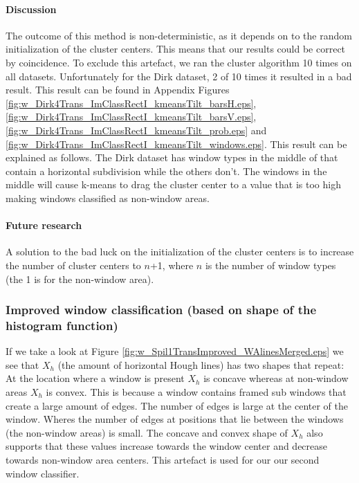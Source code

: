 

\paragraph{Discussion}  %
The outcome of this method is non-deterministic, as it depends on to the random
initialization of the cluster centers. This means that our results could be
correct by coincidence.  To exclude this artefact, we ran the cluster algorithm
10 times on all datasets. Unfortunately for the Dirk dataset, 2 of 10 times it 
resulted in a bad result. This result can be found in Appendix
Figures \ref{fig:w_Dirk4Trans_ImClassRectI_kmeansTilt_barsH.eps},
\ref{fig:w_Dirk4Trans_ImClassRectI_kmeansTilt_barsV.eps},
\ref{fig:w_Dirk4Trans_ImClassRectI_kmeansTilt_prob.eps} and
\ref{fig:w_Dirk4Trans_ImClassRectI_kmeansTilt_windows.eps}.
This result can be explained as follows. The Dirk dataset has window types in the
middle of that contain a horizontal subdivision while the others don't.
The windows in the middle will cause k-means to drag the cluster center to a
value that is too high making windows classified as non-window areas.

\paragraph{Future research}
A solution to the bad luck on the initialization of the cluster centers 
is to increase the number of cluster centers to $n$+1, 
where $n$ is the number of window types (the 1 is for the non-window area).




\subsubsection{Improved window classification (based on shape of the histogram function)}
If we take a look at Figure \ref{fig:w_Spil1TransImproved_WAlinesMerged.eps}
we see that $X_h$ (the amount of horizontal Hough lines) has two shapes that
repeat:  At the location where a window is present $X_h$ is concave whereas at
non-window areas $X_h$ is convex. 
This is because a window contains framed sub windows that create 
a large amount of edges. The number of edges is large at the center of the
window.  Wheres the number of edges at positions that lie between the windows
(the non-window areas) is small.
The concave and convex shape of $X_h$ also supports that these values 
increase towards the window center and decrease towards
non-window area centers. This artefact is used for our 
our second window classifier.\\

